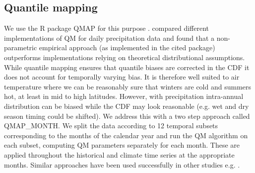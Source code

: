 \documentclass[hess, manuscript]{copernicus}
\begin{document}

\subsection{Quantile mapping}
We use the R package QMAP for this purpose \citep{Gudmundsson2012-kn}. \cite{Gudmundsson2012-kn} compared different implementations of QM for daily precipitation data and found that a non-parametric empirical approach (as implemented in the cited package) outperforms implementations relying on theoretical distributional assumptions.
While quantile mapping ensures that quantile biases are corrected in the CDF it does not account for temporally varying bias. It is therefore well suited to air temperature where we can be reasonably sure that winters are cold and summers hot, at least in mid to high latitudes. However, with precipitation intra-annual distribution can be biased while the CDF may look reasonable (e.g. wet and dry season timing could be shifted). We address this with a two step approach called QMAP\_MONTH. We split the data according to 12 temporal subsets corresponding to the months of the calendar year and run the QM algorithm on each subset, computing QM parameters separately for each month. These are applied throughout the historical and climate time series at the appropriate months. Similar approaches have been used successfully in other studies e.g. \citet{Hanzer2018-tz}. 
\end{document}
